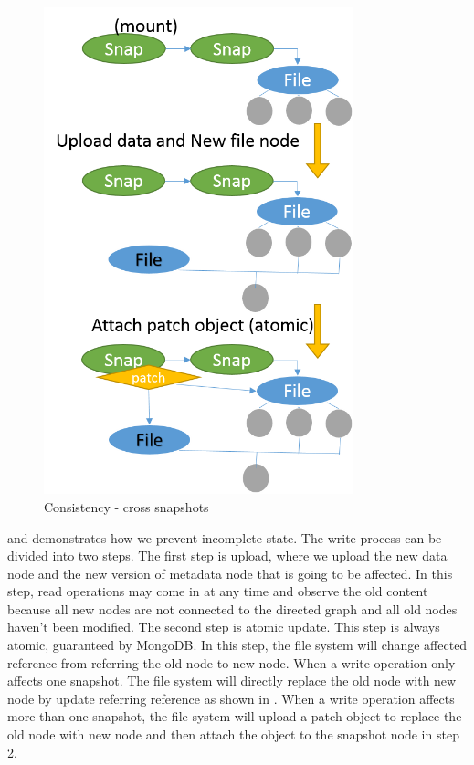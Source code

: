 \begin{figure}[hbtp]
\centering
\includegraphics[width=0.8\textwidth]{Chapter-3/figs/fig28.png}
\caption{Consistency - cross snapshots}
\label{fig:consist2}
\end{figure}

     and  demonstrates how we prevent incomplete state. The write process can be divided into two steps. The first step is upload, where we upload the new data node and the new version of metadata node that is going to be affected. In this step, read operations may come in at any time and observe the old content because all new nodes are not connected to the directed graph and all old nodes haven't been modified. The second step is atomic update. This step is always atomic, guaranteed by MongoDB. In this step, the file system will change affected reference from referring the old node to new node. When a write operation only affects one snapshot. The file system will directly replace the old node with new node by update referring reference as shown in . When a write operation affects more than one snapshot, the file system will upload a patch object to replace the old node with new node and then attach the object to the snapshot node in step 2.

